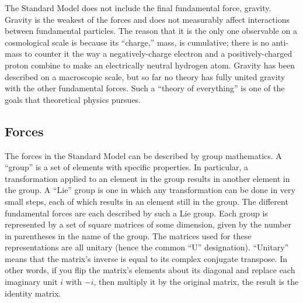 The Standard Model does not include the final 
fundamental force, gravity.  
Gravity is the weakest of the forces and does not 
measurably affect interactions between fundamental particles.  
The reason that it is the only one observable on a 
cosmological scale is because its ``charge,'' mass, 
is cumulative; there is no anti-mass to counter it 
the way a negatively-charge electron and a positively-charged 
proton combine to make an electrically neutral hydrogen atom.  
Gravity has been described on a macroscopic scale, but 
so far no theory has fully united gravity with the 
other fundamental forces.  
Such a ``theory of everything'' is 
one of the goals that 
theoretical physics %
pursues.  





\subsection{Forces}
\label{theory:ForcesGroups}

The forces in the Standard Model can be described 
by group mathematics.  
A ``group'' is a set of elements with specific properties.  
In particular, a transformation applied to an element in the group 
results in another element in the group.  
A ``Lie'' group is one in which any transformation %
can be done in very small steps, 
each of which results in an element still in the group.  
The different fundamental forces are 
each described by such a Lie group.  
Each group is represented by a set of square matrices 
of some dimension, given by the number in parentheses 
in the name of the group.  
The matrices used for these representations are 
all unitary (hence the common ``U'' designation).  
``Unitary'' means that the matrix's inverse 
is equal to its complex conjugate transpose.  
In other words, if you flip the matrix's elements 
about its diagonal and replace each imaginary unit $i$ 
with $-i$, then multiply it by the original matrix, 
the result is the identity matrix.   %

